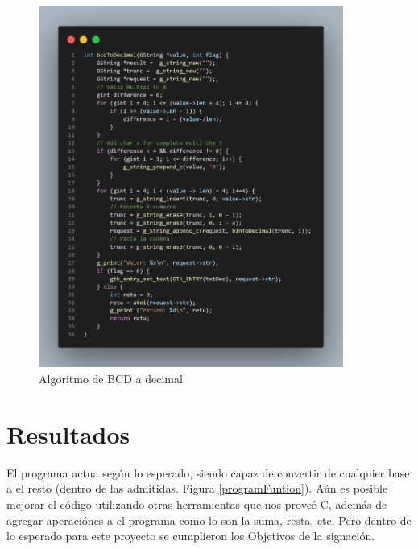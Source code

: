 \documentclass[letterpaper,12pt]{extarticle}%
\begin{document}
			\begin{figure}[H]
			\begin{center}
			\includegraphics[width=10cm]{imag//algBcdToDec.png}
			\caption{Algoritmo de BCD a decimal}
			\label{algBcdToDec}
			\end{center}
			\end{figure}
	
	\renewcommand{\labelenumi}{\arabic{enumi}.}
    
    	
    \section{Resultados}
		El programa actua según lo esperado, siendo capaz de convertir de cualquier base a el resto (dentro de las admitidas. Figura \ref{programFuntion}).
		Aún es posible mejorar el código utilizando otras herramientas que nos proveé C, además de agregar aperaciónes a el programa
		como lo son la suma, resta, etc. Pero dentro de lo esperado para este proyecto se cumplieron los Objetivos de la signación.
		
\end{document}
